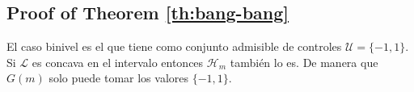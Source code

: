 
\subsection{Proof of Theorem \ref{th:bang-bang}}\label{proof:bang-bang}

El caso binivel es el que tiene como conjunto admisible de controles $\mathcal{U}= \{-1,1\}$. Si $\mathcal{L}$ es concava en el intervalo entonces $\mathcal{H}_m$ también lo es. De manera que $G(m)$ solo puede tomar los valores $\{-1,1\}$.
